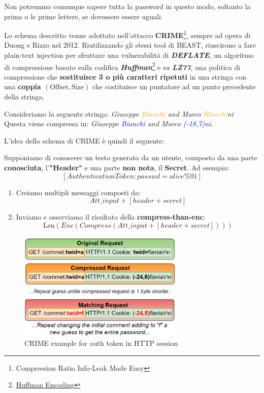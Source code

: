 \begin{remark}
Non potremmo comunque sapere tutta la password in questo modo, soltanto la prima o le prime lettere, se dovessere essere uguali. 
\end{remark}
Lo schema descritto venne adottato nell'attacco \textbf{CRIME}\footnote{Compression Ratio Info-Leak Made Easy}, sempre ad opera di Duong e Rizzo nel 2012. Riutilizzando gli stessi tool di BEAST, riuscirono a fare plain-text injection per sfruttare una vulnerabilità di \textit{\textbf{DEFLATE}}, un algoritmo di compressione basato sulla codifica \textit{\textbf{Huffman}}\footnote{\href{https://it.wikipedia.org/wiki/Codifica_di_Huffman}{Huffman Encoding}} e su \textbf{\textit{LZ77}}, una politica di compressione che \textbf{sostituisce 3 o più caratteri ripetuti} in una stringa con una \textbf{coppia $(\text{Offset}, \text{Size})$} che costituisce un puntatore ad un punto precedente della stringa.
\begin{example}[ LZ77]Consideriamo la seguente stringa:
\textit{Giuseppe \textcolor{orange}{Bianchi} and Marco \textcolor{orange}{Bianchi}ni}\\
Questa viene compressa in: \textit{Giuseppe \textcolor{blue}{Bianchi} and Marco \textcolor{blue}{(-18,7)}ni}.
\end{example}
L'idea dello schema di CRIME è quindi il seguente:
\begin{definition}[CRIME]\label{def:crime}
Supponiamo di conoscere un testo generato da un utente, composto da una parte \textbf{conosciuta}, l'\textbf{"Header"} e una parte \textbf{non nota}, il \textbf{Secret}. Ad esempio: \[[Authentication Token: passwd = alice\%01]\]
\begin{enumerate}
    \item Creiamo multipli messaggi composti da: 
    \[Att\_input + [header + secret]\]
    \item Inviamo e osserviamo il risultato della \textbf{compress-than-enc}:
    \[\text{Len}(Enc(Compress(Att\_input + [header + secret])))\]
\end{enumerate}
\end{definition}
\begin{figure}[h]
    \centering
    \includegraphics[width=0.7\textwidth]{image/crime.png}
    \caption{CRIME example for auth token in HTTP session}
    \label{fig:crime}
\end{figure}
